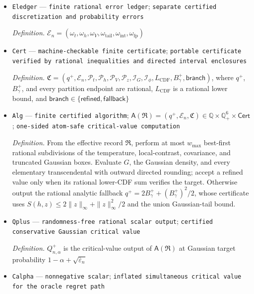 \documentclass{article}
\begin{document}
\begin{itemize}
  \par\smallskip\noindent\emph{Definition.} \(Q_{1-\alpha}^{\mathrm{LF}}=\inf\{q\in\mathbb R:\inf_{h\in\mathcal H,V\in\mathcal K_V}P\{S(h,Z_V)\le q\}\ge1-\alpha\}\)
  \item \texttt{Eledger} --- \texttt{finite rational error ledger}; \texttt{separate certified discretization and probability errors}
  \par\smallskip\noindent\emph{Definition.} \(\mathcal E_n=(\omega_t,\omega_h,\omega_V,\omega_{\mathrm{tail}},\omega_{\mathrm{int}},\omega_{\mathrm{fp}})\)
  \item \texttt{Cert} --- \texttt{machine-\allowbreak{}checkable finite certificate}; \texttt{portable certificate verified by rational inequalities and directed interval enclosures}
  \par\smallskip\noindent\emph{Definition.} \(\mathfrak C=(q^+,\mathcal E_n,\mathcal P_t,\mathcal P_h,\mathcal P_V,\mathcal P_z,\mathcal I_G,\mathcal I_\phi,L_{\mathrm{CDF}},B_\gamma^+,\mathsf{branch})\), where \(q^+\), \(B_\gamma^+\), and every partition endpoint are rational, \(L_{\mathrm{CDF}}\) is a rational lower bound, and \(\mathsf{branch}\in\{\mathsf{refined},\mathsf{fallback}\}\)
  \item \texttt{Alg} --- \texttt{finite certified algorithm}; \(\mathsf A(\mathfrak R)=(q^+,\mathcal E_n,\mathfrak C)\in\mathbb Q\times\mathbb Q_+^6\times\mathsf{Cert}\); \texttt{one-\allowbreak{}sided atom-\allowbreak{}safe critical-\allowbreak{}value computation}
  \par\smallskip\noindent\emph{Definition.} From the effective record \(\mathfrak R\), perform at most \(w_{\max}\) best-first rational subdivisions of the temperature, local-contrast, covariance, and truncated Gaussian boxes. Evaluate \(G\), the Gaussian density, and every elementary transcendental with outward directed rounding; accept a refined value only when its rational lower-CDF sum verifies the target. Otherwise output the rational analytic fallback \(q^+=2B_\gamma^++(B_\gamma^+)^2/2\), whose certificate uses \(S(h,z)\le2\|z\|_\infty+\|z\|_\infty^2/2\) and the union Gaussian-tail bound.
  \item \texttt{Qplus} --- \texttt{randomness-\allowbreak{}free rational scalar output}; \texttt{certified conservative Gaussian critical value}
  \par\smallskip\noindent\emph{Definition.} \(Q^+_{n,\alpha}\) is the critical-value output of \(\mathsf A(\mathfrak R)\) at Gaussian target probability \(1-\alpha+\sqrt{\overline\varepsilon_n}\)
  \item \texttt{Calpha} --- \texttt{nonnegative scalar}; \texttt{inflated simultaneous critical value for the oracle regret path}

\end{itemize}
\end{document}
